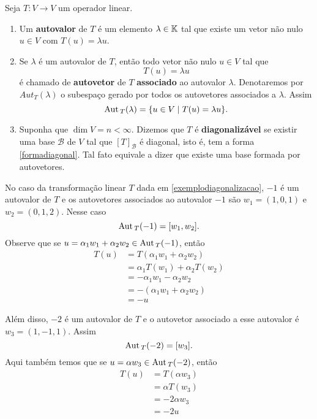\begin{definicao}
    Seja $T : V \to V$ um operador linear.
    \begin{enumerate}[label={\roman*})]
        \item Um \textbf{autovalor} de $T$ é um elemento $\lambda \in \mathbb{K}$ tal que existe um vetor não nulo $u \in V$ com $T(u) =
            \lambda u$.
        \item Se $\lambda$ é um autovalor de $T$, então todo vetor não nulo $u \in V$ tal que
        \[
            T(u) = \lambda u
        \]
        é chamado de \textbf{autovetor} de $T$ \textbf{associado} ao autovalor $\lambda$. Denotaremos por $Aut_T(\lambda)$ o subespaço
        gerado por todos os autovetores associados a $\lambda$. Assim
        \[
            {\rm Aut\,}_T(\lambda) = \{u \in V \mid T(u) = \lambda u\}.
        \]
        \item Suponha que $\dim V = n < \infty$. Dizemos que $T$ é \textbf{diagonalizável} se existir uma base $\mathcal{B}$ de $V$ tal
            que $[T]_\mathcal{B}$ é diagonal, isto é, tem a forma \eqref{formadiagonal}. Tal fato equivale a dizer que existe uma base
            formada por autovetores.
    \end{enumerate}
\end{definicao}

\begin{exemplo}
    No caso da transformação linear $T$ dada em \eqref{exemplodiagonalizacao}, $-1$ é um autovalor de $T$ e os autovetores associados ao
    autovalor $-1$ são $w_1 = (1, 0, 1)$ e $w_2 = (0, 1, 2)$. Nesse caso
    \[
        {\rm Aut\,}_T(-1) = [w_1, w_2].
    \]
    Observe que se $u = \alpha_1w_1 + \alpha_2w_2 \in {\rm Aut\,}_T(-1)$, então
    \begin{align*}
        T(u) &= T(\alpha_1w_1 + \alpha_2w_2) \\ &= \alpha_1T(w_1) + \alpha_2T(w_2) \\ &= -\alpha_1w_1 - \alpha_2w_2 \\ &= -(\alpha_1w_1 +
        \alpha_2w_2) \\ &= -u
    \end{align*}

    Além disso, $-2$ é um autovalor de $T$ e o autovetor associado a esse autovalor é $w_3 = (1, -1, 1)$. Assim
    \[
        {\rm Aut\,}_T(-2) = [w_3].
    \]
    Aqui também temos que se $u = \alpha w_3 \in {\rm Aut\,}_T(-2)$, então
    \begin{align*}
        T(u) &= T(\alpha w_3) \\ &= \alpha T(w_3) \\ &= -2\alpha w_3 \\ &= -2u
    \end{align*}
\end{exemplo}

